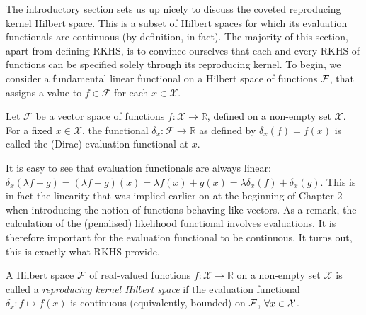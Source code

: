 The introductory section sets us up nicely to discuss the coveted reproducing kernel Hilbert space.
This is a subset of Hilbert spaces for which its evaluation functionals are continuous (by definition, in fact).
The majority of this section, apart from defining RKHS, is to convince ourselves that each and every RKHS of functions can be specified solely through its reproducing kernel.
To begin, we consider a fundamental linear functional on a Hilbert space of functions ${\mathcal F}$, that assigns a value to $f \in \mathcal F$ for each $x \in \mathcal X$.

\begin{definition}
	Let $\mathcal F$ be a vector space of functions $f:\mathcal X \rightarrow \mathbb R$, defined on a non-empty set $\mathcal X$. 
	For a fixed $x \in \mathcal X$, the functional $\delta_x:\mathcal F \rightarrow \mathbb R$ as defined by $\delta_x(f) = f(x)$ is called the (Dirac) evaluation functional at $x$.
\end{definition}

It is easy to see that evaluation functionals are always linear: $\delta_x(\lambda f + g) = (\lambda f + g)(x) = \lambda f(x) + g(x) = \lambda\delta_x(f) + \delta_x(g)$.
This is in fact the linearity that was implied earlier on at the beginning of Chapter 2 when introducing the notion of functions behaving like vectors.
As a remark, the calculation of the (penalised) likelihood functional involves evaluations. 
It is therefore important for the evaluation functional to be continuous.
It turns out, this is exactly what RKHS provide.

\begin{definition}\label{def:rkhs}
	A Hilbert space ${\mathcal F}$ of real-valued functions $f:\mathcal X \rightarrow \mathbb R$ on a non-empty set $\mathcal X$ is called a \emph{reproducing kernel Hilbert space} if the evaluation functional $\delta_x: f \mapsto f(x)$ is continuous (equivalently, bounded) on ${\mathcal F}$, $\forall x \in {\mathcal X}$. 
\end{definition}

